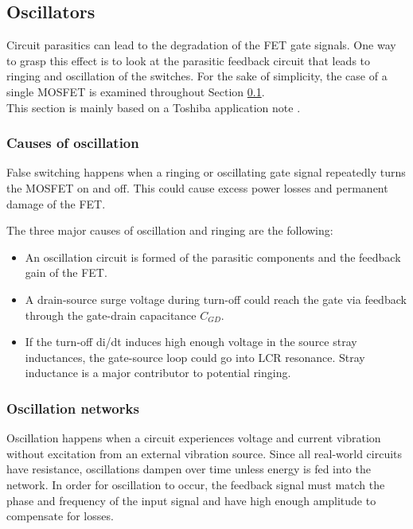 \subsection{Oscillators}
\label{sec:oscillators}

Circuit parasitics can lead to the degradation of the FET gate signals. One way to grasp this effect is to look at the parasitic feedback circuit that leads to ringing and oscillation of the switches. For the sake of simplicity, the case of a single MOSFET is examined throughout Section \ref{sec:oscillators}. \\

This section is mainly based on a Toshiba application note \cite{Toshiba_app_note}.

\subsubsection{Causes of oscillation}
\label{sec:causes_of_osc}

False switching happens when a ringing or oscillating gate signal repeatedly turns the MOSFET on and off. This could cause excess power losses and permanent damage of the FET.

The three major causes of oscillation and ringing are the following: \\

\begin{itemize}
    \item An oscillation circuit is formed of the parasitic components and the feedback gain of the FET.
    \item A drain-source surge voltage during turn-off could reach the gate via feedback through the gate-drain capacitance $C_{GD}$.
    \item If the turn-off di/dt induces high enough voltage in the source stray inductances, the gate-source loop could go into LCR resonance. Stray inductance is a major contributor to potential ringing.
\end{itemize}

\subsubsection{Oscillation networks}
\label{sec:osc_network}

Oscillation happens when a circuit experiences voltage and current vibration without excitation from an external vibration source. Since all real-world circuits have resistance, oscillations dampen over time unless energy is fed into the network. In order for oscillation to occur, the feedback signal must match the phase and frequency of the input signal and have high enough amplitude to compensate for losses.

